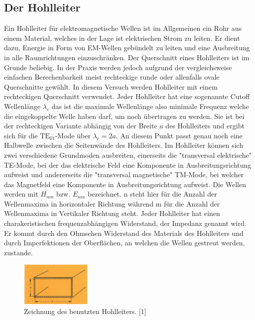 \subsection{Der Hohlleiter}
\label{sec:thwellenleiter}
Ein Hohlleiter für elektromagnetische Wellen ist im Allgemeinen ein Rohr aus einem Material, welches in der 
Lage ist elektrischen Strom zu leiten. Er dient dazu, Energie in Form von EM-Wellen gebündelt zu leiten und
eine Ausbreitung in alle Raumrichtungen einzuschränken. Der Querschnitt eines Hohlleiters ist im Grunde 
beliebig. In der Praxis werden jedoch aufgrund der vergleichsweise einfachen Berechenbarkeit meist rechteckige
runde oder allenfalls ovale Querschnitte gewählt. In diesem Versuch werden Hohlleiter mit einem rechteckigen
Querschnitt verwendet. Jeder Hohlleiter hat eine sogenannte Cutoff Wellenlänge $\lambda_c$ das ist die maximale
Wellenlänge also minimale Frequenz welche die eingekoppelte Welle haben darf, um noch übertragen zu werden.
Sie ist bei der rechteckigen Variante abhängig von der Breite $a$ des Hohlleiters und ergibt sich für die 
$\mathrm{TE}_{01}$-Mode über  $\lambda_c=2a$. An diesem Punkt
passt genau noch eine Halbwelle zwischen die Seitenwände des Hohlleiters. Im Hohlleiter können sich zwei verschiedene
Grundmoden ausbreiten, einerseits die "transversal elektrische" TE-Mode, bei der das elektrische Feld eine Komponente
in Ausbreitungsrichtung aufweist und andererseits die "transversal magnetische" TM-Mode, bei welcher das Magnetfeld
eine Komponente in Ausbreitungsrichtung aufweist. Die Wellen werden mit $H_{nm}$ bzw. $E_{nm}$
bezeichnet. n steht hier für die Anzahl der Wellenmaxima in horizontaler Richtung während m für die Anzahl der 
Wellenmaxima in Vertikaler Richtung steht. Jeder Hohlleiter hat einen charakeristischen frequenzabhängigen
Widerstand, der Impedanz genannt wird. Er kommt durch den Ohmschen Widerstand des Materials des Hohlleiters
und durch Imperfektionen der Oberflächen, an welchen die Wellen gestreut werden, zustande.

\begin{figure}
    \centering
    \includegraphics[width=0.3\textwidth,angle=0]{content/grafiken/Hohlleiter.PNG}
    \caption{Zeichnung des benutzten Hohlleiters. [1]}
    \label{fig:Hohlleiter}
  \end{figure}

